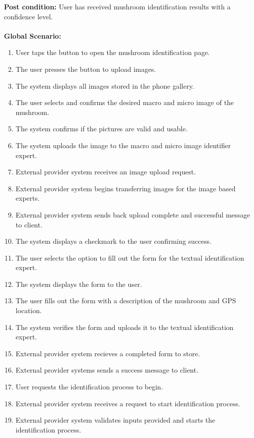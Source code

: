 \documentclass[]{article}
\begin{document}
\begin{enumerate}[{\bf BE1.}]
		\vspace{0.2cm}
		\textbf{Post condition: } User has received mushroom identification results with a confidence level.\\
		\vspace{0.1cm}\\
		{\bf Global Scenario:}\\
		\begin{enumerate}[1.]
			\item User taps the button to open the mushroom identification page.
			\item The user presses the button to upload images.
			\item The system displays all images stored in the phone gallery.
			\item The user selects and confirms the desired macro and micro image of the mushroom.
			\item The system confirms if the pictures are valid and usable.
			\item The system uploads the image to the macro and micro image identifier expert.
			\item External provider system receives an image upload request.
			\item External provider system begins transferring images for the image based experts.
			\item External provider system sends back upload complete and successful message to client.
			\item The system displays a checkmark to the user confirming success.
			\item The user selects the option to fill out the form for the textual identification expert. 
			\item The system displays the form to the user.
			\item The user fills out the form with a description of the mushroom and GPS location.
			\item The system verifies the form and uploads it to the textual identification expert.
			\item External provider system recieves a completed form to store.
			\item External provider systems sends a success message to client.
			\item User requests the identification process to begin.
			\item External provider system receives a request to start identification process.
			\item External provider system validates inputs provided and starts the identification process.

\end{enumerate}
\end{enumerate}
\end{document}
